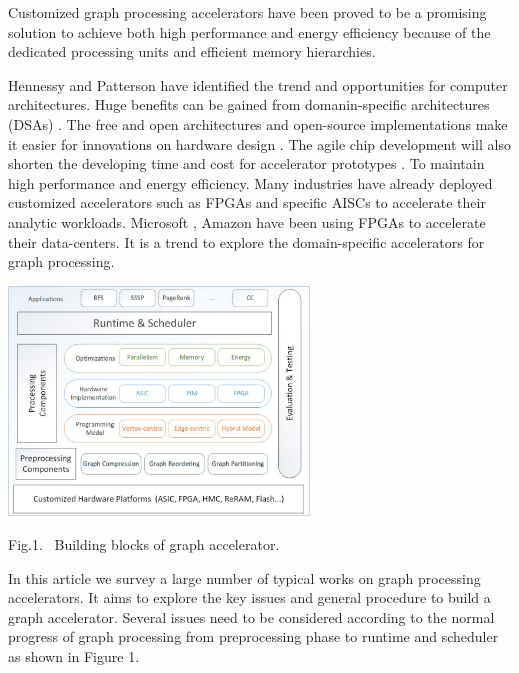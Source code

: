 \documentclass[twoside]{article}
\begin{document}
\begin{multicols}{2}
Customized graph processing accelerators have been proved to be a promising solution to achieve both high performance and energy efficiency \cite{ham2016graphicionado,Dai2017foregraph,ahn2015tesseract} because of the dedicated processing units and efficient memory hierarchies. 

Hennessy and Patterson have identified the trend and opportunities for computer architectures. Huge benefits can be gained from domanin-specific architectures (DSAs) \cite{DSA}. The free and open architectures and open-source implementations make it easier for innovations on hardware design \cite{DDFCP,RISCV, ERI}. The agile chip development will also shorten the developing time and cost for accelerator prototypes \cite{AGILE, ADH}. To maintain high performance and energy efficiency. Many industries have already deployed customized accelerators such as FPGAs and specific AISCs to accelerate their analytic workloads. Microsoft \cite{microsoftazure}, Amazon \cite{aws-ec2} have been using FPGAs to accelerate their data-centers. It is a trend to explore the domain-specific accelerators for graph processing.

\vspace{2mm}

\begin{center}
\includegraphics[width = 8cm]{pictures/graphacc.pdf}\\
\vspace{2mm}
\parbox[c]{8.3cm}{\footnotesize{Fig.1.~}  Building blocks of graph accelerator. }%
\end{center}

\vspace{1mm}

In this article we survey a large number of typical works on graph processing accelerators. It aims to explore the key issues and general procedure to build a graph accelerator. Several issues need to be considered according to the normal progress of graph processing from preprocessing phase to runtime and scheduler as shown in Figure 1.


\end{multicols}
\end{document}
